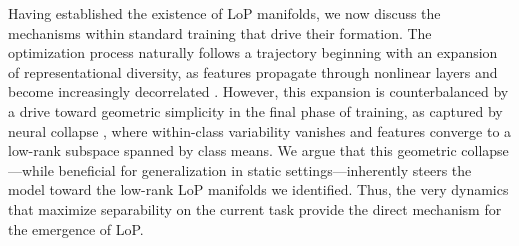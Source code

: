 \documentclass{article}
\numberwithin{figure}{section}
\begin{document}
Having established the existence of LoP manifolds, we now discuss the mechanisms within standard training that drive their formation. The optimization process naturally follows a trajectory beginning with an expansion of representational diversity, as features propagate through nonlinear layers and become increasingly decorrelated \citep{poole2016exponential}. However, this expansion is counterbalanced by a drive toward geometric simplicity in the final phase of training, as captured by neural collapse \citep{papyan2020prevalence}, where within-class variability vanishes and features converge to a low-rank subspace spanned by class means. We argue that this geometric collapse—while beneficial for generalization in static settings—inherently steers the model toward the low-rank LoP manifolds we identified. Thus, the very dynamics that maximize separability on the current task provide the direct mechanism for the emergence of LoP.




\end{document}
